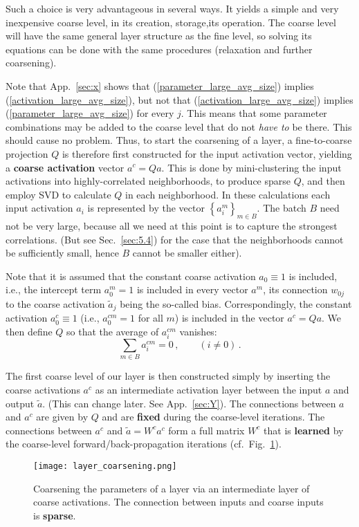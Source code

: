 \documentclass{article} %
\begin{document}
Such a choice is very advantageous in several ways. It yields a simple and very inexpensive coarse level, in its creation, storage,its operation. The coarse level will have the same general layer structure as the fine level, so solving its equations can be done with the same procedures (relaxation and further coarsening).

Note that App.~\ref{sec:x} shows that (\ref{parameter_large_avg_size}) implies (\ref{activation_large_avg_size}), but not that (\ref{activation_large_avg_size}) implies (\ref{parameter_large_avg_size}) for every $j$. This means that some parameter combinations may be added to the coarse level that do not {\it have to} be there. This should cause no problem. Thus, to start the coarsening of a layer, a fine-to-coarse projection $Q$ is therefore first constructed for the input activation vector, yielding a \textbf{coarse activation} vector $a^c = Qa$. This is done by mini-clustering the input activations into highly-correlated neighborhoods, to produce sparse $Q$, and then employ SVD to calculate $Q$ in each neighborhood. In these calculations each input activation $a_i$ is represented by the vector $\left\{ a^m_i \right\}_{m \in B}$. The batch $B$ need not be very large, because all we need at this point is to capture the strongest correlations. (But see Sec.~\ref{sec:5.4}) for the case that the neighborhoods cannot be sufficiently small, hence $B$ cannot be smaller either). 

Note that it is assumed that the constant coarse activation $a_0 \equiv 1$ is included, i.e., the intercept term $a_0^m = 1$ is included in every vector $a^m$, its connection $w_{0j}$ to the coarse activation $\tilde{a}_j$ being the so-called bias. Correspondingly, the constant activation $a_0^c \equiv 1$ (i.e., $a_0^{cm} = 1$ for all $m$) is included in the vector $a^c = Q a$. We then define $Q$ so that the average of $a_i^{cm}$ vanishes:
$$
    \sum_{m \in B} a_i^{cm} = 0\,,\qquad (i \not = 0)\,.
$$

The first coarse level of our layer is then constructed simply by inserting the coarse activations $a^c$ as an intermediate activation layer between the input $a$ and output $\tilde{a}$. (This can change later. See App.~\ref{sec:Y}). The connections between $a$ and $a^c$ are given by $Q$ and are \textbf{fixed} during the coarse-level iterations. The connections between $a^{c}$ and $\tilde{a} = W^c a^c$ form a full matrix $W^c$ that is \textbf{learned} by the coarse-level forward/back-propagation iterations (cf.~Fig.~\ref{fig:layer_coarsening}). 
\begin{figure}[htbp]
  \centering
  \texttt{[image: layer\_coarsening.png]}
  \caption{Coarsening the parameters of a layer via an intermediate layer of coarse activations. The connection between inputs and coarse inputs is \textbf{sparse}.}
  \label{fig:layer_coarsening}
\end{figure}
\end{document}
